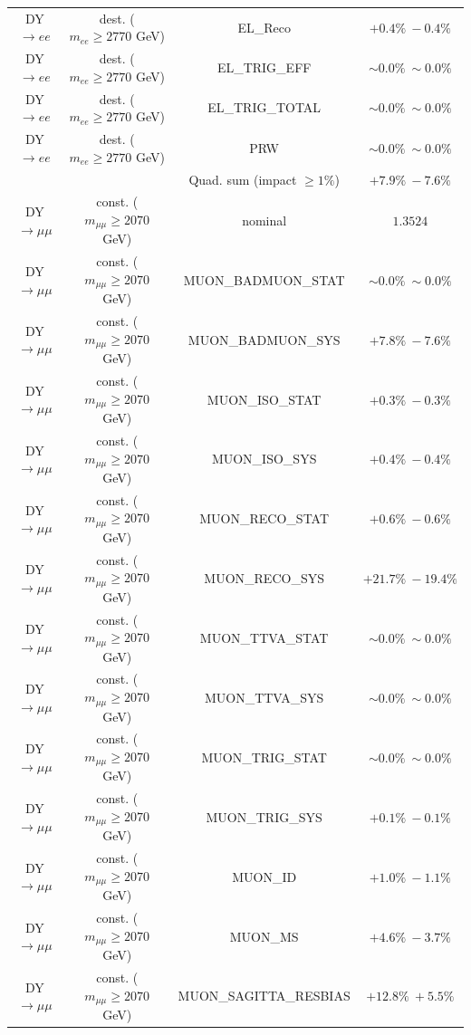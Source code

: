 {\begin{table}[]
\begin{center}
\begin{tabular}{|c|c|c|c|}
DY$\rightarrow ee$ & dest. ($m_{ee} \geq 2770$ GeV) & EL\_Reco & $+ 0.4\% \   -0.4\%$ \\
DY$\rightarrow ee$ & dest. ($m_{ee} \geq 2770$ GeV) & EL\_TRIG\_EFF & $\sim 0.0\% \ \sim 0.0\%$ \\
DY$\rightarrow ee$ & dest. ($m_{ee} \geq 2770$ GeV) & EL\_TRIG\_TOTAL & $\sim 0.0\% \ \sim 0.0\%$ \\
DY$\rightarrow ee$ & dest. ($m_{ee} \geq 2770$ GeV) & PRW & $\sim 0.0\% \ \sim 0.0\%$ \\
\hline
 & & Quad. sum (impact $\geq 1\%$) & $+ 7.9\% \   -7.6\%$ \\
\hline
\hline
DY$\rightarrow \mu\mu$ & const. ($m_{\mu\mu} \geq 2070$ GeV) & nominal & $1.3524$ \\
DY$\rightarrow \mu\mu$ & const. ($m_{\mu\mu} \geq 2070$ GeV) & MUON\_BADMUON\_STAT & $\sim 0.0\% \ \sim 0.0\%$ \\
DY$\rightarrow \mu\mu$ & const. ($m_{\mu\mu} \geq 2070$ GeV) & MUON\_BADMUON\_SYS & $+ 7.8\% \   -7.6\%$ \\
DY$\rightarrow \mu\mu$ & const. ($m_{\mu\mu} \geq 2070$ GeV) & MUON\_ISO\_STAT & $+ 0.3\% \   -0.3\%$ \\
DY$\rightarrow \mu\mu$ & const. ($m_{\mu\mu} \geq 2070$ GeV) & MUON\_ISO\_SYS & $+ 0.4\% \   -0.4\%$ \\
DY$\rightarrow \mu\mu$ & const. ($m_{\mu\mu} \geq 2070$ GeV) & MUON\_RECO\_STAT & $+ 0.6\% \   -0.6\%$ \\
DY$\rightarrow \mu\mu$ & const. ($m_{\mu\mu} \geq 2070$ GeV) & MUON\_RECO\_SYS & $+ 21.7\% \   -19.4\%$ \\
DY$\rightarrow \mu\mu$ & const. ($m_{\mu\mu} \geq 2070$ GeV) & MUON\_TTVA\_STAT & $\sim 0.0\% \ \sim 0.0\%$ \\
DY$\rightarrow \mu\mu$ & const. ($m_{\mu\mu} \geq 2070$ GeV) & MUON\_TTVA\_SYS & $\sim 0.0\% \ \sim 0.0\%$ \\
DY$\rightarrow \mu\mu$ & const. ($m_{\mu\mu} \geq 2070$ GeV) & MUON\_TRIG\_STAT & $\sim 0.0\% \ \sim 0.0\%$ \\
DY$\rightarrow \mu\mu$ & const. ($m_{\mu\mu} \geq 2070$ GeV) & MUON\_TRIG\_SYS & $+ 0.1\% \   -0.1\%$ \\
DY$\rightarrow \mu\mu$ & const. ($m_{\mu\mu} \geq 2070$ GeV) & MUON\_ID & $+ 1.0\% \   -1.1\%$ \\
DY$\rightarrow \mu\mu$ & const. ($m_{\mu\mu} \geq 2070$ GeV) & MUON\_MS & $+ 4.6\% \   -3.7\%$ \\
DY$\rightarrow \mu\mu$ & const. ($m_{\mu\mu} \geq 2070$ GeV) & MUON\_SAGITTA\_RESBIAS & $+ 12.8\% \ + 5.5\%$ \\

\end{tabular}
\end{center}
\end{table}}
